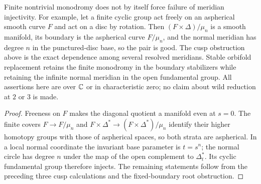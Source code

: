 \begin{proposition}\label{P1e-finite}
Finite nontrivial monodromy does not by itself force failure of
meridian injectivity. For example, let a finite cyclic group act
freely on an aspherical smooth curve $F$ and act on a disc by
rotation. Then $(F\times\Delta)/\mu_n$ is a smooth manifold,
its boundary is the aspherical curve $F/\mu_n$, and the normal
meridian has degree $n$ in the punctured-disc base, so the pair
is good. The cusp obstruction above is the exact dependence
among several resolved meridians. Stable orbifold replacement
retains the finite monodromy in the boundary stabilizers while
retaining the infinite normal meridian in the open fundamental
group. All assertions here are over $\mathbb C$ or in characteristic
zero; no claim about wild reduction at $2$ or $3$ is made.
\end{proposition}
\begin{proof}
Freeness on $F$ makes the diagonal quotient a manifold even at
$s=0$. The finite covers $F\to F/\mu_n$ and
$F\times\Delta^*\to (F\times\Delta^*)/\mu_n$
identify their higher homotopy groups with those of aspherical
spaces, so both strata are aspherical. In a local normal coordinate
the invariant base parameter is $t=s^n$; the normal circle has degree
$n$ under the map of the open complement to $\Delta_t^*$.
Its cyclic fundamental group therefore injects. The remaining
statements follow from the preceding three cusp calculations and
the fixed-boundary root obstruction.
\end{proof}
